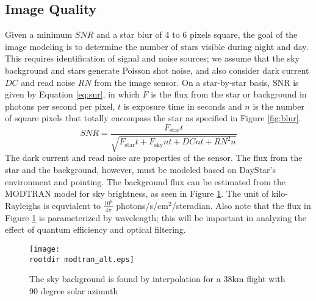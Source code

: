 \documentclass[twocolumn,letterpaper]{IEEEAerospace2012}
\newcommand{\rootdir}{./Figures/}
\newcommand{\RN}{\mathit{RN}}
\newcommand{\DC}{\mathit{DC}}
\newcommand{\SNR}{\mathit{SNR}}
\newcommand{\sub}[1]{\text{#1}} %
\begin{document}
\subsection{Image Quality}
Given a minimum $\SNR$ and a star blur of 4 to 6 pixels square, the goal of the image modeling is to determine the number of stars visible during night and day. This requires identification of signal and noise sources; we assume that the sky background and stars generate Poisson shot noise, and also consider dark current $\DC$ and read noise $\RN$ from the image sensor. On a star-by-star basis, SNR is given by Equation \ref{eq:snr}, in which $F$ is the flux from the star or background in photons per second per pixel, $t$ is exposure time in seconds and $n$ is the number of square pixels that totally encompass the star as specified in Figure \ref{fig:blur}.
\begin{equation}
    \label{eq:snr}
    \SNR = \frac{F_{\sub{star}}t}{\sqrt{F_{\sub{star}} t + F_{\sub{sky}} n t + \DC n t + \RN^2 n }}
\end{equation}
The dark current and read noise are properties of the sensor. The flux from the star and the background, however, must be modeled based on DayStar's environment and pointing. The background flux can be estimated from the MODTRAN model for sky brightness, as seen in Figure \ref{fig:modtran}. The unit of kilo-Rayleighs is equvialent to $\frac{10^{9}}{4\pi}$ photons/s/cm$^2$/steradian. Also note that the flux in Figure \ref{fig:modtran} is parameterized by wavelength; this will be important in analyzing the effect of quantum efficiency and optical filtering. %
\begin{figure}
    \label{fig:modtran}
    \texttt{[image: \\rootdir modtran\_alt.eps]}
    \caption{The sky background is found by interpolation for a 38km flight with 90 degree solar azimuth}
\end{figure}
\end{document}
